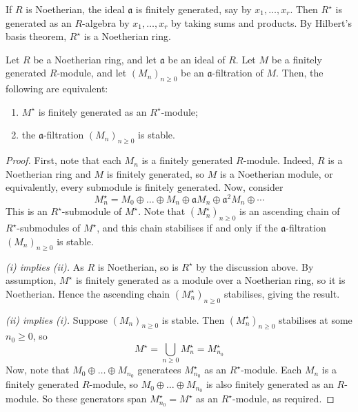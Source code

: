 If \( R \) is Noetherian, the ideal \( \mathfrak a \) is finitely generated, say by \( x_1, \dots, x_r \).
Then \( R^\star \) is generated as an \( R \)-algebra by \( x_1, \dots, x_r \) by taking sums and products.
By Hilbert's basis theorem, \( R^\star \) is a Noetherian ring.
\begin{lemma}
    Let \( R \) be a Noetherian ring, and let \( \mathfrak a \) be an ideal of \( R \).
    Let \( M \) be a finitely generated \( R \)-module, and let \( (M_n)_{n \geq 0} \) be an \( \mathfrak a \)-filtration of \( M \).
    Then, the following are equivalent:
    \begin{enumerate}
        \item \( M^\star \) is finitely generated as an \( R^\star \)-module;
        \item the \( \mathfrak a \)-filtration \( (M_n)_{n \geq 0} \) is stable.
    \end{enumerate}
\end{lemma}
\begin{proof}
    First, note that each \( M_n \) is a finitely generated \( R \)-module.
    Indeed, \( R \) is a Noetherian ring and \( M \) is finitely generated, so \( M \) is a Noetherian module, or equivalently, every submodule is finitely generated.
    Now, consider
    \[ M^\star_n = M_0 \oplus \dots \oplus M_n \oplus \mathfrak a M_n \oplus \mathfrak a^2 M_n \oplus \cdots \]
    This is an \( R^\star \)-submodule of \( M^\star \).
    Note that \( (M^\star_n)_{n \geq 0} \) is an ascending chain of \( R^\star \)-submodules of \( M^\star \), and this chain stabilises if and only if the \( \mathfrak a \)-filtration \( (M_n)_{n \geq 0} \) is stable.

    \emph{(i) implies (ii).}
    As \( R \) is Noetherian, so is \( R^\star \) by the discussion above.
    By assumption, \( M^\star \) is finitely generated as a module over a Noetherian ring, so it is Noetherian.
    Hence the ascending chain \( (M^\star_n)_{n \geq 0} \) stabilises, giving the result.

    \emph{(ii) implies (i).}
    Suppose \( (M_n)_{n \geq 0} \) is stable.
    Then \( (M^\star_n)_{n \geq 0} \) stabilises at some \( n_0 \geq 0 \), so
    \[ M^\star = \bigcup_{n \geq 0} M_n^\star = M_{n_0}^\star \]
    Now, note that \( M_0 \oplus \dots \oplus M_{n_0} \)
    generatees \( M^\star_{n_0} \) as an \( R^\star \)-module.
    Each \( M_n \) is a finitely generated \( R \)-module, so \( M_0 \oplus \dots \oplus M_{n_0} \) is also finitely generated as an \( R \)-module.
    So these generators span \( M^\star_{n_0} = M^\star \) as an \( R^\star \)-module, as required.
\end{proof}
